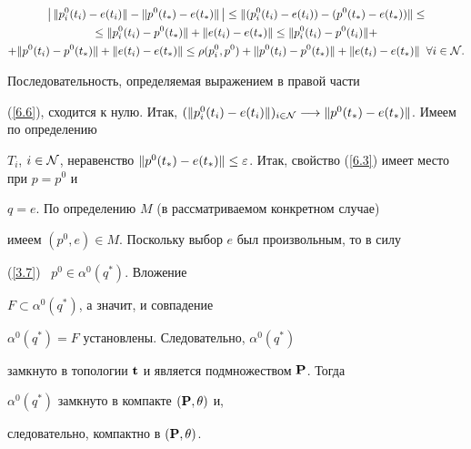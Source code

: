 \begin{pf}
\begin{multline}\label{6.6}


\big|\,\|{p_i^0}(t_i) - {e(t_i)}\| - \|{p^0}(t_*) - {e(t_*)}\|\,\big|\le


\|({p_i^0}(t_i) - {e(t_i)}) - ({p^0}(t_*) - {e(t_*)})\| \le\\ 


%


\le \|{p_i^0}(t_i) - {p^0}(t_*)\| + \|{e(t_i)} - {e(t_*)}\| \le


\|{p_i^0}(t_i) - {p^0}(t_i)\| +\\


%


+ \|{p^0}(t_i) -


{p^0}(t_*)\| + \|{e(t_i)} - {e(t_*)}\| \le {\rho}({p_i^0},{p^0}) +


\|{p^0}(t_i) - {p^0}(t_*)\| + \|{e(t_i)} -


{e(t_*)}\|\;\;\fo{i} \in \cal{N}.


\end{multline}


Последовательность, определяемая выражением в правой части


(\ref{6.6}), сходится к нулю. Итак, $(\|{p_i^0}(t_i) - {e(t_i)}\|)_{i


\in \cal{N}} \lo \|{p^0}(t_*) - {e(t_*)}\|$. Имеем по определению


${T_i}$, $i \in \cal{N}$, неравенство $\|{p^0}(t_*) - {e(t_*)}\|


\le \var$. Итак, свойство (\ref{6.3}) имеет место при $p = {p^0}$ и


$q = e$. По определению $M$ (в рассматриваемом конкретном случае)


имеем $(p^0,e) \in M$. Поскольку выбор $e$ был произвольным, то в силу


(\ref{3.7}) \ ${p^0} \in {{\alpha}^0}(q^*)$. Вложение


$F\subset {{\alpha}^0}(q^*)$, а значит, и совпадение


${{\alpha}^0}(q^*) = F$ установлены. Следовательно, ${{\alpha}^0}(q^*)$


замкнуто в топологии $\bold{t}$ и является подмножеством $\bold{P}$. Тогда


${{\alpha}^0}(q^*)$ замкнуто в компакте $(\bold{P},\theta)$ и,


следовательно, компактно в $(\bold{P},\theta)$.


\end{pf}





